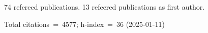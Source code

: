 74 refereed publications. 13 refeered publications as first author.

Total citations~=~4577; h-index~=~36 (2025-01-11)